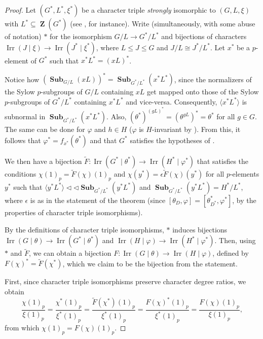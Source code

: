 \documentclass[12pt]{amsart}
\DeclareMathOperator{\ZB}{\mathbf{Z}}
\DeclareMathOperator{\Sub}{\mathbf{Sub}}
\DeclareMathOperator{\Irr}{Irr}
\theoremstyle{remark}
\theoremstyle{definition}
\theoremstyle{plain}
\theoremstyle{definition}
\numberwithin{equation}{section}
\begin{document}
\begin{proof}
	Let $(G^*, L^*, \xi^*)$ be a character triple \emph{strongly} isomorphic to $(G, L, \xi)$ with $L^* \subseteq \ZB(G^*)$ (see \cite[Problem 5.4]{CTMcKC}, for instance). Write (simultaneously, with some abuse of notation) $*$ for the isomorphism $G/L \to G^*/L^*$ and bijections of characters $\Irr(J \mid \xi) \to \Irr(J^* \mid \xi^*)$, where $L \leq J \leq G$ and $J/L \cong J^*/L^*$. Let $x^*$ be a $p$-element of $G^*$ such that $x^*L^* = (xL)^*$.
	
	Notice how $(\Sub_{G/L}(xL))^* = \Sub_{G^*/L^*}(x^*L^*)$, since the normalizers of the Sylow $p$-subgroups of $G/L$ containing $xL$ get mapped onto those of the Sylow $p$-subgroups of $G^*/L^*$ containing $x^*L^*$ and vice-versa. Consequently, $\langle x^*L^* \rangle$ is subnormal in $\Sub_{G^*/L^*}(x^*L^*)$. Also, $(\theta^*)^{(gL)^*} = (\theta^{gL})^* = \theta^*$ for all $g \in G$. The same can be done for $\varphi$ and $h \in H$ ($\varphi$ is $H$-invariant by ). From this, it follows that $\varphi^* = f_{x^*}(\theta^*)$ and that $G^*$ satisfies the hypotheses of . 
	
	We then have a bijection $\tilde{F}:\Irr(G^* \mid \theta^*) \to \Irr(H^* \mid \varphi^*)$ that satisfies the conditions $\chi(1)_p = \tilde{F}(\chi)(1)_p$ and $\chi(y^*) = \epsilon \tilde{F}(\chi)(y^*)$ for all $p$-elements $y^*$ such that $\langle y^*L^* \rangle {\triangleleft}{\triangleleft} \Sub_{G^*/L^*}(y^*L^*)$ and $\Sub_{G^*/L^*}(y^*L^*) = H^*/L^*$, where $\epsilon$ is as in the statement of the theorem (since $[\theta_D, \varphi] = [\theta^*_{D^*}, \varphi^*]$, by the properties of character triple isomorphisms). 
	
	By the definitions of character triple isomorphisms, $*$ induces bijections $\Irr(G \mid \theta) \to \Irr(G^* \mid \theta^*)$ and $\Irr(H \mid \varphi) \to \Irr(H^* \mid \varphi^*)$. Then, using $*$ and $\tilde{F}$, we can obtain a bijection $F: \Irr(G \mid \theta) \to \Irr(H \mid \varphi)$, defined by $F(\chi)^* = \tilde{F}(\chi^*)$, which we claim to be the bijection from the statement.
	
	First, since character triple isomorphisms preserve character degree ratios, we obtain
	\begin{equation*}
		\frac{\chi(1)_p}{\xi(1)_p} = \frac{\chi^*(1)_p}{\xi^*(1)_p}= \frac{\tilde{F}(\chi^*)(1)_p}{\xi^*(1)_p}= \frac{F(\chi)^*(1)_p}{\xi^*(1)_p} = \frac{F(\chi)(1)_p}{\xi(1)_p},
	\end{equation*}
	from which $\chi(1)_p = F(\chi)(1)_p$. 
	

\end{proof}
\end{document}
